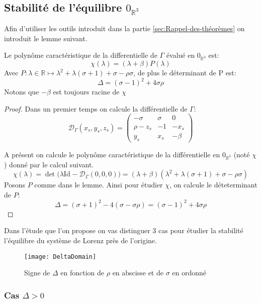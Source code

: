 \documentclass{article}
\newcommand{\R}{\mathbb{R}}
\newcommand{\id}[1][]{\ensuremath{\mathrm{Id}_{#1}}}
\newtheorem[M , nocut]{prop}{Proposition}[section]
\newtheorem[S , nocut]{definition}{Définition}
\newtheorem[S , nocut]{lemme}{Lemme}
\newtheorem[L , nocut]{thm}{Théoreme}
\newtheorem[L , nocut]{cor}{Corollaire}
\begin{document}
\subsection{Stabilité de l'équilibre $0_{\R^3}$}
Afin d'utiliser les outils introduit dans la partie \ref{sec:Rappel-des-théorèmes} on introduit le lemme suivant.
\begin{lemme}[préliminaire]
    Le polynôme caractéristique de la differentielle de $\Gamma$ évalué en $0_{\R^3}$ est:
    $$ \chi(\lambda) = (\lambda + \beta)P(\lambda)$$
    Avec $P:\lambda \in \R \mapsto \lambda^2 + \lambda(\sigma+1)+\sigma-\rho\sigma$, de plus le déterminant de P est:
    $$ \Delta = (\sigma-1)^2 +4\sigma\rho $$
    Notons que $-\beta$ est toujours racine de $\chi$
\end{lemme}

\begin{proof}
Dans un premier temps on calcule la différentielle de $\Gamma$:
\begin{equation}
    \label{eq:diff}
    \mathcal{D}_\Gamma(x_s,y_s,z_s) = 
    \left(\begin{array}{ccc}
        -\sigma & \sigma & 0\\
        \rho- z_s & -1 & -x_s\\
        y_s & x_s & -\beta
    \end{array}\right)
\end{equation}

A présent on calcule le polynôme caractéristique de la différentielle en $0_{\R^3}$ (noté $\chi$) donné par le calcul suivant.
\[
    \chi (\lambda) = \det\big(\lambda\id - \mathcal{D}_{\Gamma}(0,0,0)\big) = (\lambda + \beta)(\lambda^2 + \lambda(\sigma+1)+\sigma-\rho\sigma)
\]
Posons $P$ comme dans le lemme. Ainsi pour étudier $\chi$, on calcule le déteterminant de $P$:
\[
  \Delta = (\sigma+1)^2 - 4(\sigma-\sigma\rho) = (\sigma-1)^2 +4\sigma\rho
\]
\end{proof}

Dans l'étude que l'on propose on vas distinguer 3 cas pour étudier la stabilité l'équilibre du système de Lorenz près de l'origine.
\begin{figure}[ht]
    \centering
    \texttt{[image: DeltaDomain]}
    \caption{Signe de $\Delta$ en fonction de $\rho$ en abscisse et de $\sigma$ en ordonné}
    \label{fig:signD}
\end{figure}


\subsubsection*{Cas $\Delta > 0$}
\end{document}

